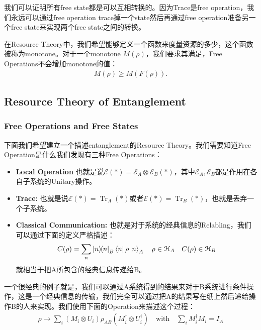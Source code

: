 我们可以证明所有free state都是可以互相转换的。因为Trace是free operation，我们永远可以通过free
operation trace掉一个state然后再通过free operation准备另一个free state来实现两个free state之间的转换。

\bigskip
{}

在Resource Theory中，我们希望能够定义一个函数来度量资源的多少，这个函数被称为monotone。对于一个monotone $
M(\rho) $，我们要求其满足，Free Operations不会增加monotone的值：
\begin{align}
  M(\rho)\geq M(F(\rho)).
\end{align}

\subsection{Resource Theory of Entanglement}

\subsubsection{Free Operations and Free States}

\bigskip
{}

下面我们希望建立一个描述entanglement的Resource Theory。我们需要知道Free
Operation是什么我们发现有三种Free Operations：
\begin{itemize}
  \item \textbf{Local Operation} 也就是说$ \mathcal{E}( * ) =
    \mathcal{E}_A \otimes \mathcal{E}_B ( * ) $，其中$ \mathcal{E}_A,
    \mathcal{E}_B $都是作用在各自子系统的Unitary操作。
  \item \textbf{Trace:} 也就是说$ \mathcal{E}( * ) = \operatorname{Tr}_A(
    * ) $或者$ \mathcal{E}( * ) = \operatorname{Tr}_B( * ) $，也就是丢弃一个子系统。
  \item \textbf{Classical Communication:}
    也就是对于系统的经典信息的Relabling，我们可以通过下面的定义严格描述：
    \begin{align}
      C(\rho) = \sum_n \left| n \middle\rangle\!\middle\langle n \right|_B \left\langle n \right| \rho \left| n \right\rangle_A \quad
      \rho \in \mathcal{H}_A \quad C(\rho) \in \mathcal{H}_B
    \end{align}
    就相当于把A所包含的经典信息传递给B。
\end{itemize}
一个很经典的例子就是，我们可以通过A系统得到的结果来对于B系统进行条件操作，这是一个经典信息的传输，我们完全可以通过把A的结果写在纸上然后递给操作B的人来实现。我们使用下面的Operation来描述这个过程：
\begin{align}
  \rho \to \sum_i (M_i \otimes U_i) \rho_{AB} (M_i^\dagger \otimes
  U_i^\dagger) \quad \text{with} \quad \sum_i M_i^\dagger M_i = I_A
\end{align}

